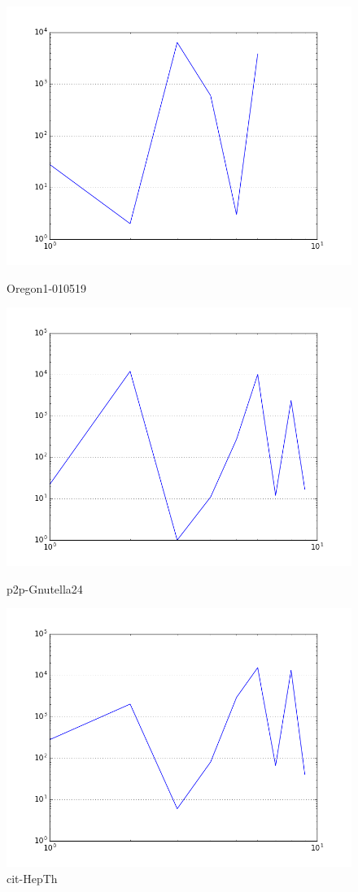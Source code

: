 \begin{figure}[H]
  \includegraphics[width=\linewidth]{img/oregon-010519/radius_dist.png}
  \caption*{Oregon1-010519}
\endminipage\hfill
{}
  \includegraphics[width=\linewidth]{img/p2p-Gnutella24/radius_dist.png}
  \caption*{p2p-Gnutella24}
\endminipage\hfill
{}
  \includegraphics[width=\linewidth]{img/cit-HepTh/radius_dist.png}
  \caption*{cit-HepTh}
\endminipage
\end{figure}

